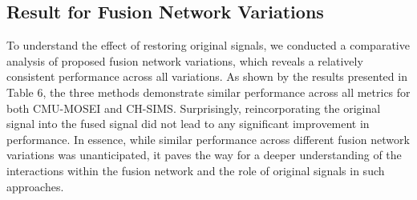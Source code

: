 \documentclass[11pt]{article}
\begin{document}
\subsection{Result for Fusion Network Variations}
% 
To understand the effect of restoring original signals, we conducted a comparative analysis of proposed fusion network variations, which reveals a relatively consistent performance across all variations. As shown by the results presented in Table 6, the three methods demonstrate similar performance across all metrics for both CMU-MOSEI and CH-SIMS. Surprisingly, reincorporating the original signal into the fused signal did not lead to any significant improvement in performance.
In essence, while  similar performance across different fusion network variations was unanticipated, it paves the way for a deeper understanding of the interactions within the fusion network and the role of original signals in such approaches.
\end{document}
